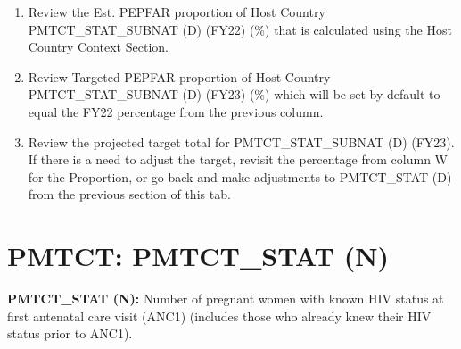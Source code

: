 \documentclass[
  openany]{book}
\begin{document}
\begin{enumerate}
\def\labelenumi{\arabic{enumi}.}
\item
  Review the Est. PEPFAR proportion of Host Country
  PMTCT\_STAT\_SUBNAT (D) (FY22) (\%) that is calculated using the Host
  Country Context Section.
\item
  Review Targeted PEPFAR proportion of Host Country
  PMTCT\_STAT\_SUBNAT (D) (FY23) (\%) which will be set by default to
  equal the FY22 percentage from the previous column.
\item
  Review the projected target total for PMTCT\_STAT\_SUBNAT (D) (FY23).
  If there is a need to adjust the target, revisit the percentage from
  column W for the Proportion, or go back and make adjustments to
  PMTCT\_STAT (D) from the previous section of this tab.
\end{enumerate}

\hypertarget{pmtct-pmtct_stat-n}{%
\section{PMTCT: PMTCT\_STAT (N)}\label{pmtct-pmtct_stat-n}}

\textbf{PMTCT\_STAT (N):} Number of pregnant women with known HIV status at
first antenatal care visit (ANC1) (includes those who already knew their
HIV status prior to ANC1).

\begin{table}
\centering\begingroup\fontsize{12}{14}\selectfont

\endgroup{}
\end{table}
\end{document}
